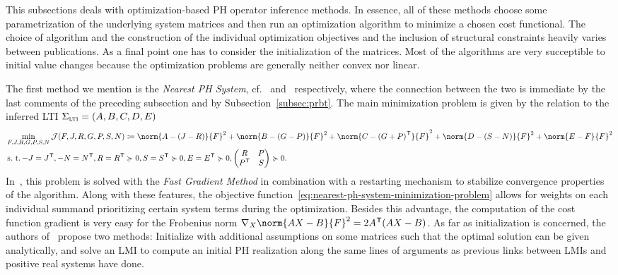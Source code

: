 This subsections deals with optimization-based \ac{PH} operator inference methods.
In essence, all of these methods choose some parametrization of the underlying system matrices and then run an optimization algorithm to minimize a chosen cost functional.
The choice of algorithm and the construction of the individual optimization objectives and the inclusion of structural constraints heavily varies between publications.
As a final point one has to consider the initialization of the matrices.
Most of the algorithms are very succeptible to initial value changes because the optimization problems are generally neither convex nor linear.

The first method we mention is the \emph{Nearest \ac{PH} System}, cf.~\cite{Gillis2018} and~\cite{Cherifi2019} respectively, where the connection between the two is immediate by the last comments of the preceding subsection and by Subsection~\ref{subsec:prbt}.
The main minimization problem is given by the relation to the inferred \ac{LTI} $\Sigma_{\textnormal{\scshape lti}} = (A, B, C, D, E)$
\begin{equation}\label{eq:nearest-ph-system-minimization-problem}
    \begin{aligned}
        &\min\limits_{F, J, R, G, P, S, N} \mcl{J}(F, J, R, G, P, S, N) \coloneqq \norm{A - (J - R)}{F}^2 + \norm{B - (G - P)}{F}^2 + \norm{C - {(G + P)}\trans}{F}^2 + \norm{D - (S - N)}{F}^2 + \norm{E - F}{F}^2 \\
        &\suchthat -J = J\trans, -N = N\trans, R = R\trans \succcurlyeq 0, S = S\trans \succcurlyeq 0, E = E\trans \succcurlyeq 0, \begin{pmatrix}
            R & P \\
            P\trans & S
        \end{pmatrix} \succcurlyeq 0.
    \end{aligned}
\end{equation}
In~\cite{Gillis2018}, this problem is solved with the \emph{Fast Gradient Method} in combination with a restarting mechanism to stabilize convergence properties of the algorithm.
Along with these features, the objective function~\eqref{eq:nearest-ph-system-minimization-problem} allows for weights on each individual summand prioritizing certain system terms during the optimization.
Besides this advantage, the computation of the cost function gradient is very easy for the Frobenius norm $\nabla_X \norm{A X - B}{F}^2 = 2 A\trans (A X - B)$.
As far as initialization is concerned, the authors of~\cite{Gillis2018} propose two methods: Initialize with additional assumptions on some matrices such that the optimal solution can be given analytically, and solve an LMI to compute an initial \ac{PH} realization along the same lines of arguments as previous links between LMIs and positive real systems have done.

